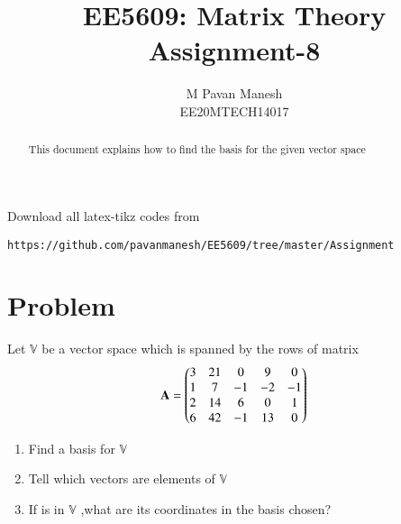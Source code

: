 \documentclass[journal,12pt,twocolumn]{IEEEtran}
\begin{document}
\makeatletter
{}
\makeatother
\let\StandardTheFigure\thefigure
\let\vec\mathbf
\renewcommand{\thefigure}{\theproblem}
\def\putbox#1#2#3{\makebox[0in][l]{\makebox[#1][l]{}\raisebox{\baselineskip}[0in][0in]{\raisebox{#2}[0in][0in]{#3}}}}
     \def\rightbox#1{\makebox[0in][r]{#1}}
     \def\centbox#1{\makebox[0in]{#1}}
     \def\topbox#1{\raisebox{-\baselineskip}[0in][0in]{#1}}
     \def\midbox#1{\raisebox{-0.5\baselineskip}[0in][0in]{#1}}
\vspace{3cm}
\title{EE5609: Matrix Theory\\
          Assignment-8\\}
\author{M Pavan Manesh\\
EE20MTECH14017 }
\maketitle
\newpage
\bigskip
\renewcommand{\thefigure}{\theenumi}
\renewcommand{\thetable}{\theenumi}
\begin{abstract}
This document explains how to find the basis for the given vector space
\end{abstract}
Download all latex-tikz codes from 
%
\begin{lstlisting}
https://github.com/pavanmanesh/EE5609/tree/master/Assignment
\end{lstlisting}
%
\section{Problem}
Let $\mathbb{V}$ be a vector space which is spanned by the rows of matrix
\begin{align}
    \vec{A} = \myvec{3&21&0&9&0\\1&7&-1&-2&-1\\2&14&6&0&1\\6&42&-1&13&0}\label{eq:mat}
\end{align}
\begin{enumerate}[label=\alph*.]
\item Find a basis for $\mathbb{V}$
\item Tell which vectors  are elements of $\mathbb{V}$ 
\item If  is in $\mathbb{V}$ ,what are its coordinates in the basis chosen?
\end{enumerate}
\end{document}
